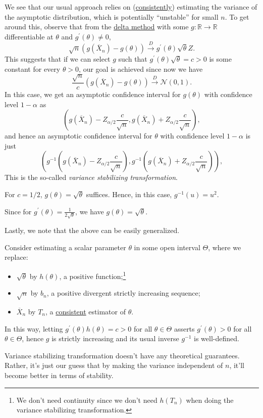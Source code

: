 We see that our usual approach relies on (\hyperref[def:consistent]{consistently}) estimating the variance of the asymptotic distribution, which is potentially ``unstable'' for small \(n\). To get around this, observe that from the \hyperref[thm:delta-method]{delta method} with some \(g \colon \mathbb{R} \to \mathbb{R} \) differentiable at \(\theta \) and \(g^{\prime} (\theta ) \neq 0\),
\[
	\sqrt{n} (g(\overline{X} _n) - g(\theta )) \overset{D}{\to} g^{\prime} (\theta ) \sqrt{\theta } Z.
\]
This suggests that if we can select \(g\) such that \(g^{\prime} (\theta ) \sqrt{\theta } = c > 0\) is some constant for every \(\theta > 0\), our goal is achieved since now we have
\[
	\frac{\sqrt{n}}{c} (g(\overline{X} _n) - g(\theta )) \overset{D}{\to} \mathcal{N} (0, 1).
\]
In this case, we get an asymptotic confidence interval for \(g(\theta )\) with confidence level \(1 - \alpha \) as
\[
	\left( g(\overline{X} _n) - Z_{\alpha / 2} \frac{c}{\sqrt{n} } , g(\overline{X} _n) + Z_{\alpha / 2} \frac{c}{\sqrt{n} } \right),
\]
and hence an asymptotic confidence interval for \(\theta \) with confidence level \(1 - \alpha \) is just
\[
	\left( g^{-1} \left( g(\overline{X} _n) - Z_{\alpha / 2} \frac{c}{\sqrt{n} } \right) , g^{-1} \left( g(\overline{X} _n) + Z_{\alpha / 2} \frac{c}{\sqrt{n} } \right) \right),
\]
This is the so-called \emph{variance stabilizing transformation}.

\begin{claim}
	For \(c = 1 / 2\), \(g(\theta ) = \sqrt{\theta } \) suffices. Hence, in this case, \(g^{-1} (u) = u^2\).
\end{claim}
\begin{explanation}
	Since for \(g^{\prime} (\theta ) = \frac{1}{2 \sqrt{\theta } }\), we have \(g(\theta ) = \sqrt{\theta } \).
\end{explanation}

Lastly, we note that the above can be easily generalized.

\begin{remark}
	Consider estimating a scalar parameter \(\theta \) in some open interval \(\Theta \), where we replace:
	\begin{itemize}
		\item \(\sqrt{\theta }\) by \(h(\theta )\), a positive function;\footnote{We don't need continuity since we don't need \(h(T_n)\) when doing the variance stabilizing transformation.}
		\item \(\sqrt{n}\) by \(b_n\), a positive divergent strictly increasing sequence;
		\item \(\overline{X} _n\) by \(T_n\), a \hyperref[def:consistent]{consistent} estimator of \(\theta \).
	\end{itemize}
	In this way, letting \(g^{\prime} (\theta ) h(\theta ) = c > 0\) for all \(\theta \in \Theta \) asserts \(g^{\prime} (\theta ) > 0\) for all \(\theta \in \Theta \), hence \(g\) is strictly increasing and its usual inverse \(g^{-1} \) is well-defined.
\end{remark}

\begin{note}
	Variance stabilizing transformation doesn't have any theoretical guarantees. Rather, it's just our guess that by making the variance independent of \(n\), it'll become better in terms of stability.
\end{note}